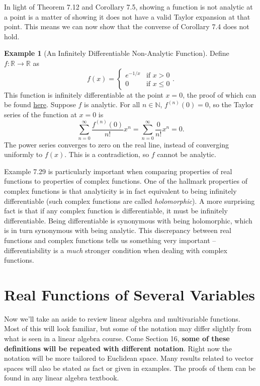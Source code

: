 \documentclass{article}
\newcommand{\N}{\mathbb{N}}
\newcommand{\R}{\mathbb{R}}
\theoremstyle{definition}
\newtheorem{example}{Example}[section]
\begin{document}
In light of Theorem 7.12 and Corollary 7.5, showing a function is not analytic at a point is a matter of showing it does not have a valid Taylor expansion at that point. This means we can now show that the converse of Corollary 7.4 does not hold.
\begin{example}[An Infinitely Differentiable Non-Analytic Function]
	Define $ f:\R\to\R $ as $$ f(x) =\begin{cases}
		e^{-1/x} &\text{if }x>0\\
		0&\text{if } x\le 0
	\end{cases}. $$
This function is infinitely differentiable at the point $ x = 0 $, the proof of which can be found \href{https://en.wikipedia.org/wiki/Non-analytic_smooth_function}{here}. Suppose $ f $ is analytic. For all $ n\in \N $, $ f^{(n)}(0)=0 $, so the Taylor series of the function at $ x = 0 $ is 
$$ \sum_{n=0}^{\infty}\frac{f^{(n)}(0)}{n!}x^n = \sum_{n=0}^{\infty}\frac{0}{n!}x^n = 0.$$
 The power series converges to zero on the real line, instead of converging uniformly to $ f(x) $. This is a contradiction, so $ f $ cannot be analytic.
\end{example}

Example 7.29 is particularly important when comparing properties of real functions to properties of complex functions. One of the hallmark properties of complex functions is that analyticity is in fact equivalent to being infinitely differentiable (such complex functions are called \textit{\color{red}holomorphic}). A more surprising fact is that if any complex function is differentiable, it must be infinitely differentiable. Being differentiable is synonymous with being holomorphic, which is in turn synonymous with being analytic. This discrepancy between real functions and complex functions tells us something very important -- differentiability is a \textit{much} stronger condition when dealing with complex functions. 
\section{Real Functions of Several Variables}
Now we'll take an aside to review linear algebra and multivariable functions. Most of this will look familiar, but some of the notation may differ slightly from what is seen in a linear algebra course. Come Section 16, \textbf{some of these definitions will be repeated with different notation}. Right now the notation will be more tailored to Euclidean space. Many results related to vector spaces will also be stated as fact or given in examples. The proofs of them can be found in any linear algebra textbook. 
\end{document}
